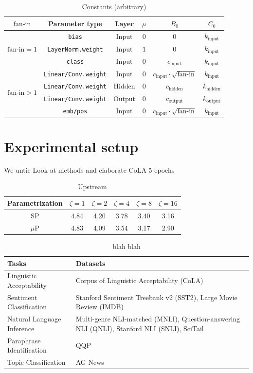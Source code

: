 \documentclass{article}
\newcommand{\mup}{$\mu$P}
\newcommand{\fanin}{\text{fan-in}}
\newcommand{\cinput}{c_{\text{input}}}
\newcommand{\chidden}{c_{\text{hidden}}}
\newcommand{\coutput}{c_{\text{output}}}
\newcommand{\kinput}{k_{\text{input}}}
\newcommand{\khidden}{k_{\text{hidden}}}
\newcommand{\koutput}{k_{\text{output}}}
\begin{document}
\begin{table}[h!]
\Centering
\begin{tabular}{cccccc}
\toprule
$\fanin$ & Parameter type & Layer & $\mu$ & $B_0$ & $C_0$\\
\midrule
\multirow{3}{*}{$\fanin=1$} & \texttt{bias} & Input & $0$ & $0$ & $\kinput$\\
& \texttt{LayerNorm.weight} & Input & $1$ & $0$ & $\kinput$\\
& \texttt{class} & Input & $0$ & $\cinput$ & $\kinput$\\
\cmidrule{1-6}
\multirow{4}{*}{$\fanin>1$} & \texttt{Linear/Conv.weight}  & Input & $0$ & $\cinput \cdot \sqrt{\fanin}$ & $\kinput$\\
& \texttt{Linear/Conv.weight}  & Hidden & $0$ & $\chidden$ & $\khidden$\\
& \texttt{Linear/Conv.weight}  & Output & $0$ & $\coutput$ & $\koutput$\\
\cmidrule{2-6}
& \texttt{emb/pos} & Input & $0$ & $\cinput \cdot \sqrt{\fanin}$ & $\kinput$\\
\bottomrule
\end{tabular}
\caption{Constants (arbitrary)}
\end{table}

\section{Experimental setup}
We untie
Look at methods and elaborate
CoLA 5 epochs

\begin{table}[h!]
\Centering
\begin{tabular}{cccccc}
\toprule
Parametrization & $\zeta=1$ & $\zeta=2$ & $\zeta=4$ & $\zeta=8$ & $\zeta=16$\\
\midrule
SP & 4.84 & 4.20 & 3.78 & 3.40 & 3.16\\
\mup & 4.83 & 4.09 & 3.54 & 3.17 & 2.90\\
\bottomrule
\end{tabular}
\caption{Upstream}
\end{table}

\begin{table}[h!]
\Centering
\begin{tabular}{lp{20em}}
\toprule
\textbf{Tasks} & \textbf{Datasets} \\
\midrule
Linguistic Acceptability & Corpus of Linguistic Acceptability (CoLA) \\
Sentiment Classification & Stanford Sentiment Treebank v2 (SST2), Large Movie Review (IMDB) \\
Natural Language Inference & Multi-genre NLI-matched (MNLI), Question-answering NLI (QNLI), Stanford NLI (SNLI), SciTail \\
Paraphrase Identification & QQP \\
Topic Classification & AG News \\
\bottomrule
\end{tabular}
\caption{blah blah}
\end{table}
\end{document}
